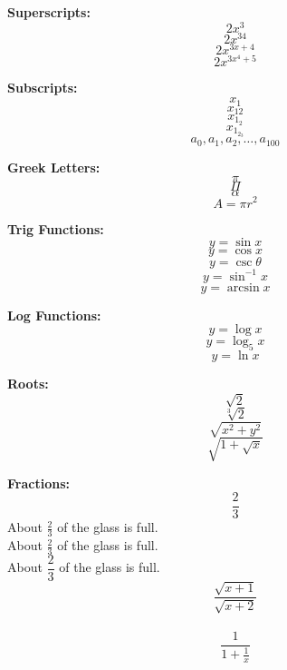 \documentclass[11 pt]{article}
\begin{document}
\textbf{Superscripts:} $$ 2x^3$$
$$2x^{34}$$
$$2x^{3x+4}$$
$$2x^{3x^4+5} $$

\textbf{Subscripts:}
$$x_1$$
$$x_{12}$$
$$x_{1_2}$$
$$x_{1_{2_3}}$$
$$a_0,a_1,a_2,\ldots,a_{100}$$

\textbf{Greek Letters:}
$$\pi$$ %
$$\Pi$$ %
$$\alpha$$
$$A=\pi r^2$$

\textbf{Trig Functions:}
$$y=\sin x$$
$$y=\cos x$$
$$y=\csc \theta$$
$$y=\sin^{-1} x$$
$$y=\arcsin x$$

\textbf{Log Functions:}
$$y=\log x$$
$$y=\log_5 x$$
$$y=\ln x$$

\textbf{Roots:}
$$\sqrt{2}$$
$$\sqrt[3]{2}$$
$$\sqrt{x^2+y^2}$$
$$\sqrt{ 1+\sqrt{x} }$$

\textbf{Fractions:}
$$\frac{2}{3}$$
About $\displaystyle \frac{2}{3}$ of the glass is full. \\[16pt]
About $\frac{2}{3}$ of the glass is full. \\[6pt]
About $\dfrac{2}{3}$ of the glass is full. \\[6pt]
$$\frac{\sqrt{x+1}}{\sqrt{x+2}} $$ \\[6pt]
$$\frac{1}{1+\frac{1}{x}}$$
\end{document}
